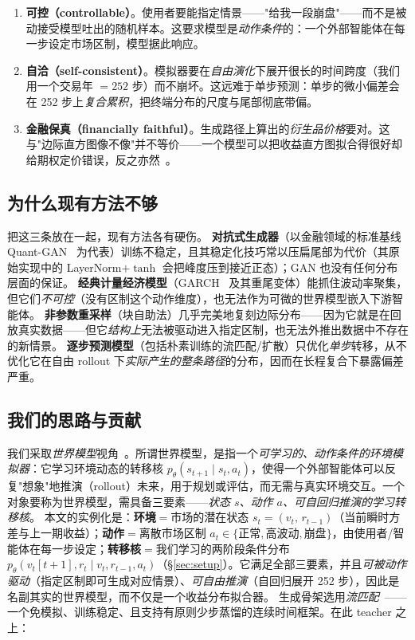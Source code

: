 \documentclass[11pt]{ctexart}
\newcommand{\vt}{v_t}
\begin{document}
\begin{enumerate}\itemsep2pt
\item \textbf{可控（controllable）}。使用者要能指定情景——"给我一段崩盘"——而不是被动接受模型吐出的随机样本。这要求模型是\emph{动作条件}的：一个外部智能体在每一步设定市场区制，模型据此响应。
\item \textbf{自洽（self-consistent）}。模拟器要在\emph{自由演化}下展开很长的时间跨度（我们用一个交易年 $=252$ 步）而不崩坏。这远难于单步预测：单步的微小偏差会在 252 步上\emph{复合累积}，把终端分布的尺度与尾部彻底带偏。
\item \textbf{金融保真（financially faithful）}。生成路径上算出的\emph{衍生品价格}要对。这与"边际直方图像不像"并不等价——一个模型可以把收益直方图拟合得很好却给期权定价错误，反之亦然~\citep{cont2001empirical}。
\end{enumerate}

\subsection{为什么现有方法不够}
把这三条放在一起，现有方法各有硬伤。
\textbf{对抗式生成器}（以金融领域的标准基线 Quant-GAN~\citep{wiese2020quant} 为代表）训练不稳定，且其稳定化技巧常以压扁尾部为代价（其原始实现中的 LayerNorm$+\tanh$ 会把峰度压到接近正态）；GAN 也没有任何分布层面的保证。
\textbf{经典计量经济模型}（GARCH~\citep{bollerslev1986garch} 及其重尾变体）能抓住波动率聚集，但它们\emph{不可控}（没有区制这个动作维度），也无法作为可微的世界模型嵌入下游智能体。
\textbf{非参数重采样}（块自助法）几乎完美地复刻边际分布——因为它就是在回放真实数据——但它\emph{结构上}无法被驱动进入指定区制，也无法外推出数据中不存在的新情景。
\textbf{逐步预测模型}（包括朴素训练的流匹配/扩散）只优化\emph{单步}转移，从不优化它在自由 rollout 下\emph{实际产生的整条路径}的分布，因而在长程复合下暴露偏差严重。

\subsection{我们的思路与贡献}
我们采取\emph{世界模型}视角~\citep{ha2018world,alonso2024diamond}。所谓世界模型，是指一个\emph{可学习的、动作条件的环境模拟器}：它学习环境动态的转移核 $p_\theta(s_{t+1}\mid s_t, a_t)$，使得一个外部智能体可以反复"想象"地推演（rollout）未来，用于规划或评估，而无需与真实环境交互。一个对象要称为世界模型，需具备三要素——\emph{状态 $s$、动作 $a$、可自回归推演的学习转移核}。
本文的实例化是：\textbf{环境}$=$市场的潜在状态 $s_t=(\vt,\,r_{t-1})$（当前瞬时方差与上一期收益）；\textbf{动作}$=$离散市场区制 $a_t\in\{$正常$,$高波动$,$崩盘$\}$，由使用者/智能体在每一步设定；\textbf{转移核}$=$我们学习的两阶段条件分布 $p_\theta(\vt[t+1],r_t\mid \vt,r_{t-1},a_t)$（\S\ref{sec:setup}）。它满足全部三要素，并且\emph{可被动作驱动}（指定区制即可生成对应情景）、\emph{可自由推演}（自回归展开 252 步），因此是名副其实的世界模型，而不仅是一个收益分布拟合器。
生成骨架选用\emph{流匹配}~\citep{lipman2023flow,liu2023rectified,albergo2023stochastic}——一个免模拟、训练稳定、且支持有原则少步蒸馏的连续时间框架。在此 teacher 之上：
\end{document}
